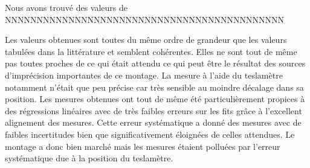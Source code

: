 Nous avons trouvé des valeurs de NNNNNNNNNNNNNNNNNNNNNNNNNNNNNNNNNNNNNNNNNNNN %


Les valeurs obtenues sont toutes du même ordre de grandeur que les valeurs tabulées dans la littérature \cite{notice} et semblent cohérentes. Elles ne sont tout de même pas toutes proches de ce qui était attendu ce qui peut être le résultat des sources d'imprécision importantes de ce montage. La mesure à l'aide du teslamètre notamment n'était que peu précise car très sensible au moindre décalage dans sa position. Les mesures obtenues ont tout de même été particulièrement propices à des régressions linéaires avec de très faibles erreurs sur les fits grâce à l'excellent alignement des mesures. Cette erreur systématique a donné des mesures avec de faibles incertitudes bien que significativement éloignées de celles attendues. Le montage a donc bien marché mais les mesures étaient polluées par l'erreur systématique due à la position du teslamètre.